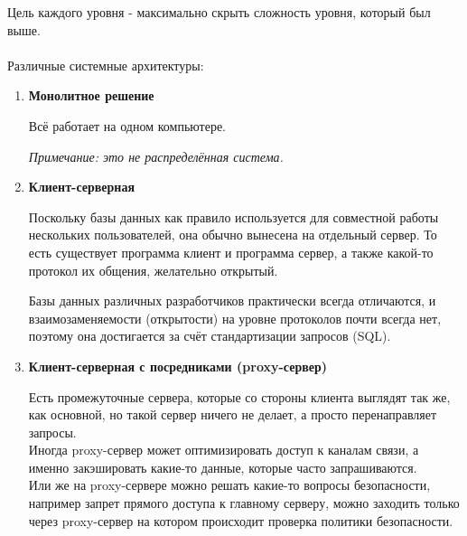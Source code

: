 \noindent Цель каждого уровня - максимально скрыть сложность уровня, который был выше.\\
\\
{\large Различные системные архитектуры:}
\begin{enumerate}
\item \textbf{ Монолитное решение}

Всё работает на одном компьютере.

\textit{ Примечание: это не распределённая система.}

\item \textbf{ Клиент-серверная}

Поскольку базы данных как правило используется для совместной работы нескольких пользователей, она обычно вынесена на отдельный сервер. 
То есть существует программа клиент и программа сервер, а также какой-то протокол их общения, желательно открытый.

Базы данных различных разработчиков практически всегда отличаются, и взаимозаменяемости (открытости) на уровне протоколов почти всегда нет, поэтому она достигается за счёт стандартизации запросов (SQL).

\item \textbf{ Клиент-серверная с посредниками (proxy-сервер)}

Есть промежуточные сервера, которые со стороны клиента выглядят так же, как основной, но такой сервер ничего не делает, а просто перенаправляет запросы.\\
Иногда proxy-сервер может оптимизировать доступ к каналам связи, а именно закэшировать какие-то данные, которые часто запрашиваются.\\
Или же на proxy-сервере можно решать какие-то вопросы безопасности, например запрет прямого доступа к главному серверу, можно заходить только через proxy-сервер на котором происходит проверка политики безопасности.


\end{enumerate}
